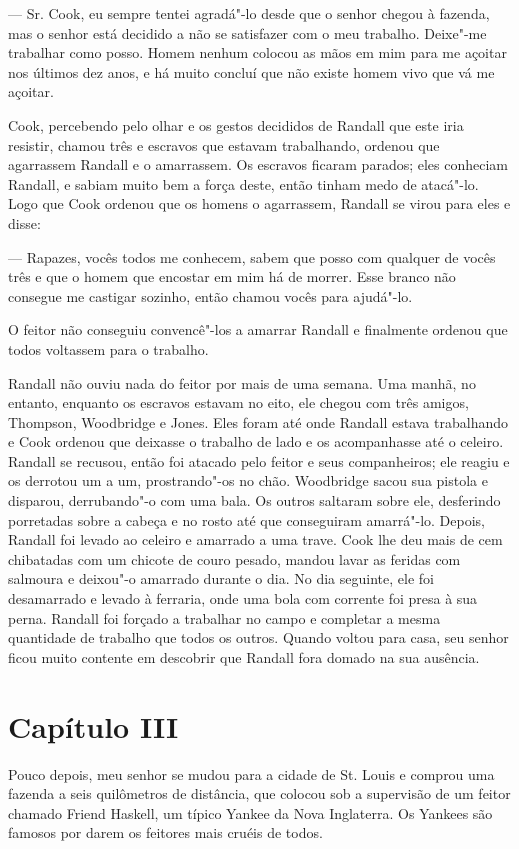 --- Sr. Cook, eu sempre tentei agradá"-lo desde que o senhor chegou à
fazenda, mas o senhor está decidido a não se satisfazer com o meu
trabalho. Deixe"-me trabalhar como posso. Homem nenhum colocou as mãos em
mim para me açoitar nos últimos dez anos, e há muito concluí que não
existe homem vivo que vá me açoitar.

Cook, percebendo pelo olhar e os gestos decididos de Randall que este
iria resistir, chamou três e escravos que estavam trabalhando, ordenou
que agarrassem Randall e o amarrassem. Os escravos ficaram parados; eles
conheciam Randall, e sabiam muito bem a força deste, então tinham medo
de atacá"-lo. Logo que Cook ordenou que os homens o agarrassem, Randall
se virou para eles e disse:

--- Rapazes, vocês todos me conhecem, sabem que posso com qualquer de
vocês três e que o homem que encostar em mim há de morrer. Esse branco
não consegue me castigar sozinho, então chamou vocês para ajudá"-lo.

O feitor não conseguiu convencê"-los a amarrar Randall e finalmente
ordenou que todos voltassem para o trabalho.

Randall não ouviu nada do feitor por mais de uma semana. Uma manhã, no
entanto, enquanto os escravos estavam no eito, ele chegou com três
amigos, Thompson, Woodbridge e Jones. Eles foram até onde Randall estava
trabalhando e Cook ordenou que deixasse o trabalho de lado e os
acompanhasse até o celeiro. Randall se recusou, então foi atacado pelo
feitor e seus companheiros; ele reagiu e os derrotou um a um,
prostrando"-os no chão. Woodbridge sacou sua pistola e disparou,
derrubando"-o com uma bala. Os outros saltaram sobre ele, desferindo
porretadas sobre a cabeça e no rosto até que conseguiram amarrá"-lo.
Depois, Randall foi levado ao celeiro e amarrado a uma trave. Cook lhe
deu mais de cem chibatadas com um chicote de couro pesado, mandou lavar
as feridas com salmoura e deixou"-o amarrado durante o dia. No dia
seguinte, ele foi desamarrado e levado à ferraria, onde uma bola com
corrente foi presa à sua perna. Randall foi forçado a trabalhar no campo
e completar a mesma quantidade de trabalho que todos os outros. Quando
voltou para casa, seu senhor ficou muito contente em descobrir que
Randall fora domado na sua ausência.

\chapter{Capítulo III}

Pouco depois, meu senhor se mudou para a cidade de St. Louis e comprou
uma fazenda a seis quilômetros de distância, que colocou sob a
supervisão de um feitor chamado Friend Haskell, um típico Yankee da Nova
Inglaterra. Os Yankees são famosos por darem os feitores mais cruéis de
todos.


